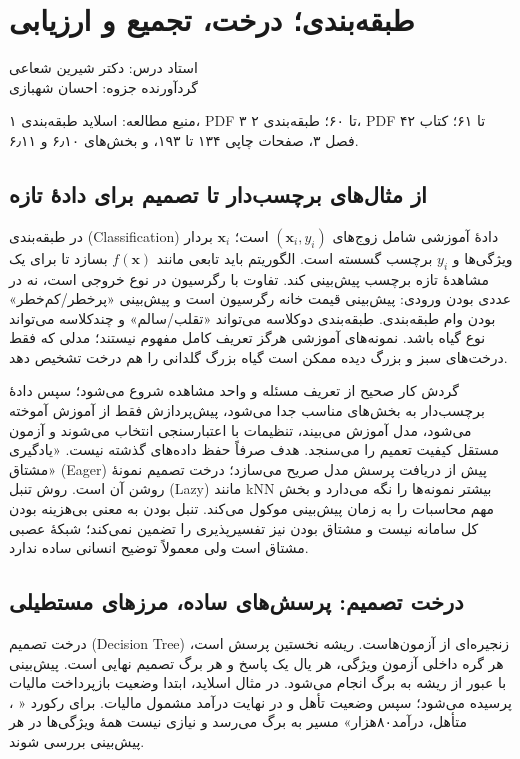 \documentclass[12pt,a4paper,oneside]{report}
\newcommand{\source}[1]{\par{\small\color{muted} منبع مطالعه: #1}\par}
\begin{document}
\setcounter{chapter}{2}
\chapter{طبقه‌بندی؛ درخت، تجمیع و ارزیابی}
\begin{center}{\small\color{muted} استاد درس: دکتر شیرین شعاعی\\[2mm] گردآورنده جزوه: احسان شهبازی}\end{center}

\source{اسلاید طبقه‌بندی ۱، PDF ۳ تا ۶۰؛ طبقه‌بندی ۲، PDF ۴۲ تا ۶۱؛ کتاب فصل ۳، صفحات چاپی ۱۳۴ تا ۱۹۳، و بخش‌های ۶٫۱۰ و ۶٫۱۱.}
\section{از مثال‌های برچسب‌دار تا تصمیم برای دادهٔ تازه}

در طبقه‌بندی (Classification) دادهٔ آموزشی شامل زوج‌های $(\mathbf x_i,y_i)$ است؛ $\mathbf x_i$ بردار ویژگی‌ها و $y_i$ برچسب گسسته است. الگوریتم باید تابعی مانند $f(\mathbf x)$ بسازد تا برای یک مشاهدهٔ تازه برچسب پیش‌بینی کند. تفاوت با رگرسیون در نوع خروجی است، نه در عددی بودن ورودی: پیش‌بینی قیمت خانه رگرسیون است و پیش‌بینی «پرخطر/کم‌خطر» بودن وام طبقه‌بندی. طبقه‌بندی دوکلاسه می‌تواند «تقلب/سالم» و چندکلاسه می‌تواند نوع گیاه باشد. نمونه‌های آموزشی هرگز تعریف کامل مفهوم نیستند؛ مدلی که فقط درخت‌های سبز و بزرگ دیده ممکن است گیاه بزرگ گلدانی را هم درخت تشخیص دهد.

گردش کار صحیح از تعریف مسئله و واحد مشاهده شروع می‌شود؛ سپس دادهٔ برچسب‌دار به بخش‌های مناسب جدا می‌شود، پیش‌پردازش فقط از آموزش آموخته می‌شود، مدل آموزش می‌بیند، تنظیمات با اعتبارسنجی انتخاب می‌شوند و آزمون مستقل کیفیت تعمیم را می‌سنجد. هدف صرفاً حفظ داده‌های گذشته نیست. «یادگیری مشتاق» (Eager) پیش از دریافت پرسش مدل صریح می‌سازد؛ درخت تصمیم نمونهٔ روشن آن است. روش تنبل (Lazy) مانند kNN بیشتر نمونه‌ها را نگه می‌دارد و بخش مهم محاسبات را به زمان پیش‌بینی موکول می‌کند. تنبل بودن به معنی بی‌هزینه بودن کل سامانه نیست و مشتاق بودن نیز تفسیرپذیری را تضمین نمی‌کند؛ شبکهٔ عصبی مشتاق است ولی معمولاً توضیح انسانی ساده ندارد.



\section{درخت تصمیم: پرسش‌های ساده، مرزهای مستطیلی}

درخت تصمیم (Decision Tree) زنجیره‌ای از آزمون‌هاست. ریشه نخستین پرسش است، هر گره داخلی آزمون ویژگی، هر یال یک پاسخ و هر برگ تصمیم نهایی است. پیش‌بینی با عبور از ریشه به برگ انجام می‌شود. در مثال اسلاید، ابتدا وضعیت بازپرداخت مالیات پرسیده می‌شود؛ سپس وضعیت تأهل و در نهایت درآمد مشمول مالیات. برای رکورد « ، متأهل، درآمد۸۰هزار» مسیر به برگ  می‌رسد و نیازی نیست همهٔ ویژگی‌ها در هر پیش‌بینی بررسی شوند.
\end{document}
